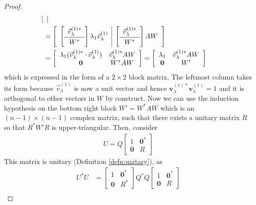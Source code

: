 \begin{proof}
\begin{align*}
\begin{bmatrix}
\end{bmatrix} \\
&= 
\left[\begin{array}{c|c}
\left[\begin{array}{c}
\vec{v}_\lambda^{(1)*} \Bstrut \\
\hline
W^* \Tstrut
\end{array}\right]\lambda_1\vec{v}_\lambda^{(1)} &
\left[\begin{array}{c}
\vec{v}_\lambda^{(1)*} \Bstrut \\
\hline
W^* \Tstrut
\end{array}\right]AW
\end{array}\right] \\
&=
\left[\begin{array}{cc}
\lambda_1 (\vec{v}_\lambda^{(1)*} \cdot \vec{v}_\lambda^{(1)}) & \vec{v}_\lambda^{(1)*}AW \\
\textbf{0} & W^*AW
\end{array}\right]
=
\left[\begin{array}{cc}
\lambda_1 & \vec{v}_\lambda^{(1)*}AW \\
\textbf{0} & W'
\end{array}\right]
\end{align*}
which is expressed in the form of a $2\times 2$ block matrix. The leftmost column takes its form because $\vec{v}_\lambda^{(1)}$ is now a unit vector and hence $\textbf{v}_\lambda^{(1)*} \textbf{v}_\lambda^{(1)} = 1$ and it is orthogonal to other vectors in $W$ by construct. Now we can use the induction hypothesis on the bottom right block $W' = W^*AW$ which is an $(n-1) \times (n-1)$ complex matrix, such that there exists a unitary matrix $R$ so that $R^*W'R$ is upper-triangular. Then, consider
\begin{align*}
U = 
Q 
\left[\begin{array}{cc}
1 & \textbf{0}^* \\
\textbf{0} & R
\end{array}\right]
\end{align*}
This matrix is unitary (Definition \ref{defn:unitary}), as
\begin{align*}
U^*U &= 
\left[\begin{array}{cc}
1 & \textbf{0}^* \\
\textbf{0} & R^*
\end{array}\right]
Q^* Q 
\left[\begin{array}{cc}
1 & \textbf{0}^* \\
\textbf{0} & R
\end{array}\right] \\

\end{align*}
\end{proof}
